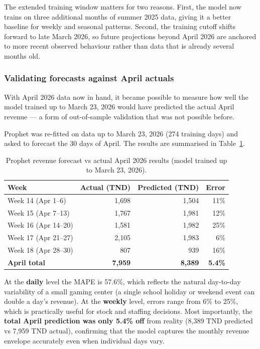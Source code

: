 \documentclass[12pt, a4paper]{report}
\begin{document}
The extended training window matters for two reasons. First, the model now
trains on three additional months of summer 2025 data, giving it a better
baseline for weekly and seasonal patterns. Second, the training cutoff shifts
forward to late March 2026, so future projections beyond April 2026 are anchored
to more recent observed behaviour rather than data that is already several
months old.

\subsubsection*{Validating forecasts against April actuals}

With April 2026 data now in hand, it became possible to measure how well the
model trained up to March 23, 2026 would have predicted the actual April
revenue --- a form of out-of-sample validation that was not possible before.

Prophet was re-fitted on data up to March 23, 2026 (274 training days) and
asked to forecast the 30 days of April. The results are summarised in
Table~\ref{tab:april_validation}.

\begin{table}[H]
  \centering
  \caption{Prophet revenue forecast vs actual April 2026 results (model trained
           up to March 23, 2026).\label{tab:april_validation}}
  \begin{tabular}{lrrr}
    \toprule
    \textbf{Week} & \textbf{Actual (TND)} & \textbf{Predicted (TND)} & \textbf{Error} \\
    \midrule
    Week 14 (Apr 1--6)   & 1{,}698 & 1{,}504 & 11\% \\
    Week 15 (Apr 7--13)  & 1{,}767 & 1{,}981 & 12\% \\
    Week 16 (Apr 14--20) & 1{,}581 & 1{,}982 & 25\% \\
    Week 17 (Apr 21--27) & 2{,}105 & 1{,}983 &  6\% \\
    Week 18 (Apr 28--30) &   807   &   939   & 16\% \\
    \midrule
    \textbf{April total} & \textbf{7{,}959} & \textbf{8{,}389} & \textbf{5.4\%} \\
    \bottomrule
  \end{tabular}
\end{table}

At the \textbf{daily} level the MAPE is 57.6\%, which reflects the natural
day-to-day variability of a small gaming center (a single school holiday or
weekend event can double a day's revenue). At the \textbf{weekly} level,
errors range from 6\% to 25\%, which is practically useful for stock and
staffing decisions. Most importantly, the \textbf{total April prediction was
only 5.4\% off} from reality (8{,}389 TND predicted vs 7{,}959 TND actual),
confirming that the model captures the monthly revenue envelope accurately
even when individual days vary.
\end{document}
